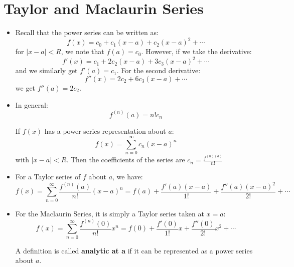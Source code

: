 \section{Taylor and Maclaurin Series}
\begin{itemize}
    \item Recall that the power series can be written as:
    \begin{equation}
        f(x) = c_0 + c_1(x-a) + c_2(x-a)^2 + \cdots 
    \end{equation}
    for $|x-a|<R$, we note that $f(a)=c_0$. However, if we take the derivative:
    \begin{equation}
        f'(x) = c_1+2c_2(x-a)+3c_3(x-a)^2 + \cdots 
    \end{equation}
    and we similarly get $f'(a)=c_1$. For the second derivative:
    \begin{equation}
        f''(x) = 2c_2 + 6c_3(x-a) + \cdots 
    \end{equation}
    we get $f''(a)=2c_2$.
    \item In general:
    \begin{equation}
        f^(n)(a) = n!c_n
    \end{equation}
    \begin{theorem}
        If $f(x)$ has a power series representation about $a$:
        \begin{equation}
            f(x)= \sum_{n=0}^\infty c_n (x-a)^n
        \end{equation}
        with $|x-a|<R$. Then the coefficients of the series are $c_n = \frac{f^{(n)(a)}}{n!}$
    \end{theorem}
    \item For a Taylor series of $f$ about $a$, we have:
    \begin{equation}
        f(x) = \sum_{n=0}^\infty \frac{f^{(n)}(a)}{n!}(x-a)^n = f(a) + \frac{f'(a)(x-a)}{1!} + \frac{f''(a)(x-a)^2}{2!} + \cdots
    \end{equation}
    \item For the Maclaurin Series, it is simply a Taylor series taken at $x=a$:
    \begin{equation}
        f(x) = \sum_{n=0}^\infty \frac{f^{(n)}(0)}{n!}x^n = f(0) + \frac{f'(0)}{1!}x+\frac{f''(0)}{2!}x^2+\cdots
    \end{equation}
    \begin{definition}
        A definition is called \textbf{analytic at a} if it can be represented as a power series about $a$.
    \end{definition}

\end{itemize}
